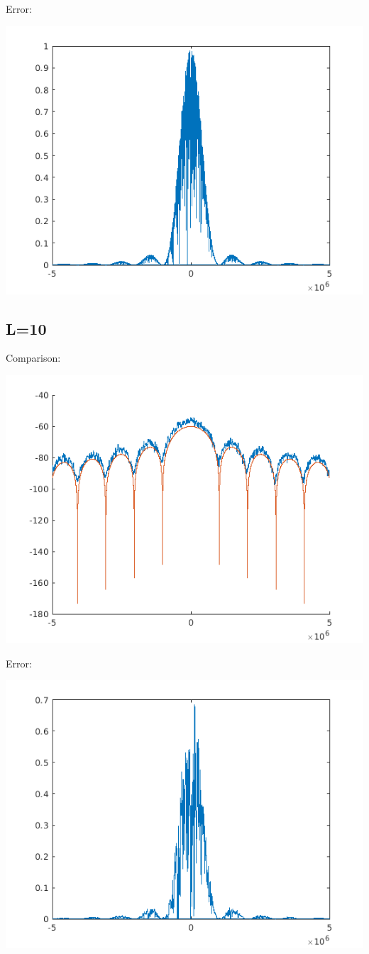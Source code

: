 \documentclass[conference,9pt]{IEEEtran}
\begin{document}
Error:

\includegraphics[scale=0.6]{me2.png}

\subsection{L=10}
Comparison:

\includegraphics[scale=0.6]{barlett10.png}

Error:

\includegraphics[scale=0.6]{me10.png}
\end{document}
